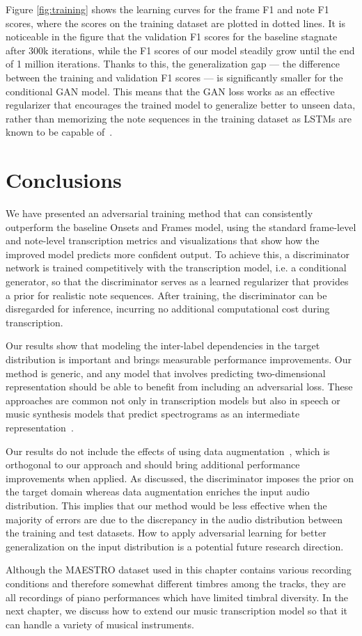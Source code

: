 Figure \ref{fig:training} shows the learning curves for the frame F1 and note F1 scores, where the scores on the training dataset are plotted in dotted lines.
It is noticeable in the figure that the validation F1 scores for the baseline stagnate after 300k iterations, while the F1 scores of our model steadily grow until the end of 1 million iterations.
Thanks to this, the generalization gap --- the difference between the training and validation F1 scores --- is significantly smaller for the conditional GAN model.
This means that the GAN loss works as an effective regularizer that encourages the trained model to generalize better to unseen data, rather than memorizing the note sequences in the training dataset as LSTMs are known to be capable of~\cite{zaremba2015recurrent}.

\section{Conclusions}

We have presented an adversarial training method that can consistently outperform the baseline Onsets and Frames model, using the standard frame-level and note-level transcription metrics and visualizations that show how the improved model predicts more confident output.
To achieve this, a discriminator network is trained competitively with the transcription model, i.e. a conditional generator, so that the discriminator serves as a learned regularizer that provides a prior for realistic note sequences.
After training, the discriminator can be disregarded for inference, incurring no additional computational cost during transcription.


Our results show that modeling the inter-label dependencies in the target distribution is important and brings measurable performance improvements.
Our method is generic, and any model that involves predicting two-dimensional representation should be able to benefit from including an adversarial loss.
These approaches are common not only in transcription models but also in speech or music synthesis models that predict spectrograms as an intermediate representation~\cite{shen2018tacotron,kim2019synthesis}.


Our results do not include the effects of using data augmentation~\cite{hawthorne2019maestro}, which is orthogonal to our approach and should bring additional performance improvements when applied.
As discussed, the discriminator imposes the prior on the target domain whereas data augmentation enriches the input audio distribution.
This implies that our method would be less effective when the majority of errors are due to the discrepancy in the audio distribution between the training and test datasets.
How to apply adversarial learning for better generalization on the input distribution is a potential future research direction.


Although the MAESTRO dataset used in this chapter contains various recording conditions and therefore somewhat different timbres among the tracks, they are all recordings of piano performances which have limited timbral diversity.
In the next chapter, we discuss how to extend our music transcription model so that it can handle a variety of musical instruments.

